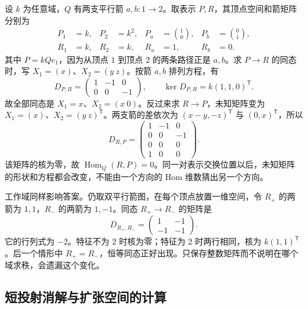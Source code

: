 \begin{example}\label{b5:exm:quiver-rectangular-hom}
	设 \(k\) 为任意域，\(Q\) 有两支平行箭 \(a,b:1\to2\)。取表示 \(P,R\)，其顶点空间和箭矩阵分别为
	\[
		\begin{aligned}
			P_1&=k,&P_2&=k^2,&P_a&=\binom10,&P_b&=\binom01,\\
			R_1&=k,&R_2&=k,&R_a&=1,&R_b&=0.
		\end{aligned}
	\]
	其中 \(P=kQe_1\)，因为从顶点 \(1\) 到顶点 \(2\) 的两条路径正是 \(a,b\)。求 \(P\to R\) 的同态时，写 \(X_1=(x)\)、\(X_2=(y\ z)\)。按箭 \(a,b\) 排列方程，有
	\[
		D_{P,R}=\begin{pmatrix}1&-1&0\\0&0&-1\end{pmatrix},
		\qquad \ker D_{P,R}=k(1,1,0)^{\mathsf T}.
	\]
	故全部同态是 \(X_1=x\)、\(X_2=(x\ 0)\)。反过来求 \(R\to P\)，未知矩阵变为 \(X_1=(x)\)、\(X_2=(y\ z)^{\mathsf T}\)。两支箭的差依次为 \((x-y,-z)^{\mathsf T}\) 与 \((0,x)^{\mathsf T}\)，所以
	\begin{equation}\label{b5:eq:quiver-rectangular-delta}
		D_{R,P}=\begin{pmatrix}1&-1&0\\0&0&-1\\0&0&0\\1&0&0\end{pmatrix}.
	\end{equation}
	该矩阵的核为零，故 \(\operatorname{Hom}_Q(R,P)=0\)。同一对表示交换位置以后，未知矩阵的形状和方程都会改变，不能由一个方向的 Hom 维数猜出另一个方向。
\end{example}

工作域同样影响答案。仍取双平行箭图，在每个顶点放置一维空间，令 \(R_+\) 的两箭为 \(1,1\)，\(R_-\) 的两箭为 \(1,-1\)。同态 \(R_+\to R_-\) 的矩阵是
\[
	D_{R_+,R_-}=\begin{pmatrix}1&-1\\-1&-1\end{pmatrix}.
\]
它的行列式为 \(-2\)。特征不为 \(2\) 时核为零；特征为 \(2\) 时两行相同，核为 \(k(1,1)^{\mathsf T}\)。后一个情形中 \(R_+=R_-\)，恒等同态正好出现。只保存整数矩阵而不说明在哪个域求秩，会遗漏这个变化。

\subsection{短投射消解与扩张空间的计算}
\label{b5:subsec:0906:02}

